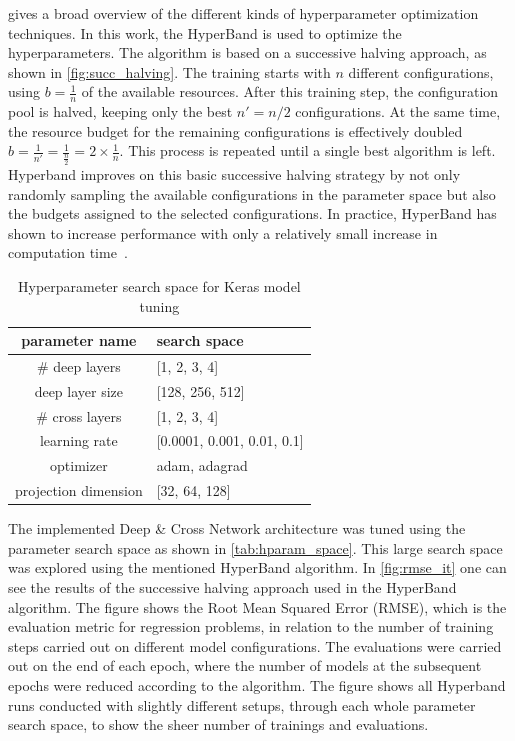 \documentclass[10pt,final,journal,a4paper,oneside,twocolumn]{IEEEtran}
\begin{document}
\cite{Feurer.2019} gives a broad overview of the different kinds of hyperparameter optimization techniques. In this work, the HyperBand \cite{li2017hyperband} is used to optimize the hyperparameters. The algorithm is based on a successive halving approach, as shown in \autoref{fig:succ_halving}.
The training starts with $n$ different configurations, using $b=\frac{1}{n}$ of the available resources. After this training step, the configuration pool is halved, keeping only the best $n' = n/2$ configurations. At the same time, the resource budget for the remaining configurations is effectively doubled $b=\frac{1}{n'}=\frac{1}{\frac{n}{2}} = 2\times\frac{1}{n}$.
This process is repeated until a single best algorithm is left. Hyperband improves on this basic successive halving strategy by not only randomly sampling the available configurations in the parameter space but also the budgets assigned to the selected configurations. In practice, HyperBand has shown to increase performance with only a relatively small increase in computation time~\cite[p. 17]{Feurer.2019}.

\begin{table}[htb]
\centering
    \caption{Hyperparameter search space for Keras model tuning}
    \begin{tabular}{cl}
            \toprule
            parameter name       & search space                   \\ 
            \midrule
            \# deep layers       & {[}1, 2, 3, 4{]}               \\
            deep layer size      & {[}128, 256, 512{]}            \\
            \# cross layers      & {[}1, 2, 3, 4{]}               \\
            learning rate        & {[}0.0001, 0.001, 0.01, 0.1{]} \\
            optimizer            & adam, adagrad                  \\
            projection dimension & {[}32, 64, 128{]}              \\ 
            \bottomrule
        \end{tabular}
    \label{tab:hparam_space}
\end{table}


The implemented Deep \& Cross Network architecture was tuned using the parameter search space as shown in \autoref{tab:hparam_space}.  This large search space was explored using the mentioned HyperBand algorithm.
In \autoref{fig:rmse_it} one can see the results of the successive halving approach used in the HyperBand algorithm. The figure shows the Root Mean Squared Error (RMSE), which is the evaluation metric for regression problems, in relation to the number of training steps carried out on different model configurations. The evaluations were carried out on the end of each epoch, where the number of models at the subsequent epochs were reduced according to the algorithm. The figure shows all Hyperband runs conducted with slightly different setups, through each whole parameter search space, to show the sheer number of trainings and evaluations.
\end{document}
